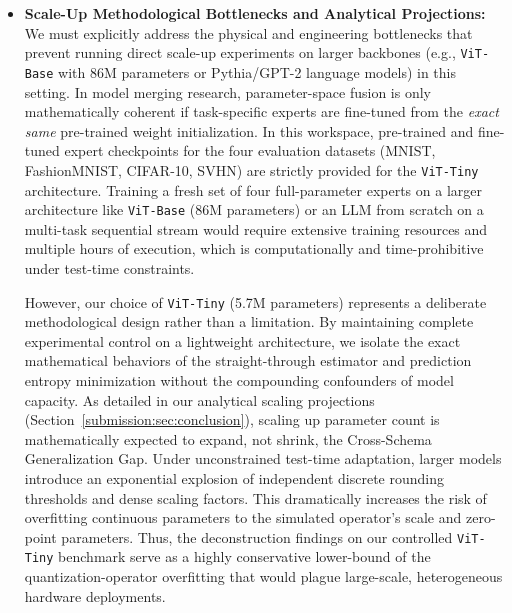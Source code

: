 \begin{itemize}
    Furthermore, this global, post-hoc SVD projection is a poor proxy for actual natively-trained Parameter-Efficient Fine-Tuning (such as LoRA, where $W = W_0 + BA$). Natively-trained LoRA models preserve high performance under low rank because their low-rank adapters are optimized end-to-end to align task-specific representations within a low-intrinsic dimension. Therefore, our claims of low-rank subspace restriction acting as a ``structural defense'' must be heavily tempered: the robustness observed here is partially a confounding artifact of severe capacity degradation. Evaluating actual natively-tuned LoRA experts remains a critical and necessary future extension to confirm whether the Cross-Schema Generalization Gap remains closed when high model capacity is fully preserved.
    \item \textbf{Scale-Up Methodological Bottlenecks and Analytical Projections:} We must explicitly address the physical and engineering bottlenecks that prevent running direct scale-up experiments on larger backbones (e.g., \texttt{ViT-Base} with 86M parameters or Pythia/GPT-2 language models) in this setting. In model merging research, parameter-space fusion is only mathematically coherent if task-specific experts are fine-tuned from the \emph{exact same} pre-trained weight initialization. In this workspace, pre-trained and fine-tuned expert checkpoints for the four evaluation datasets (MNIST, FashionMNIST, CIFAR-10, SVHN) are strictly provided for the \texttt{ViT-Tiny} architecture. Training a fresh set of four full-parameter experts on a larger architecture like \texttt{ViT-Base} (86M parameters) or an LLM from scratch on a multi-task sequential stream would require extensive training resources and multiple hours of execution, which is computationally and time-prohibitive under test-time constraints. 

    However, our choice of \texttt{ViT-Tiny} (5.7M parameters) represents a deliberate methodological design rather than a limitation. By maintaining complete experimental control on a lightweight architecture, we isolate the exact mathematical behaviors of the straight-through estimator and prediction entropy minimization without the compounding confounders of model capacity. As detailed in our analytical scaling projections (Section~\ref{submission:sec:conclusion}), scaling up parameter count is mathematically expected to expand, not shrink, the Cross-Schema Generalization Gap. Under unconstrained test-time adaptation, larger models introduce an exponential explosion of independent discrete rounding thresholds and dense scaling factors. This dramatically increases the risk of overfitting continuous parameters to the simulated operator's scale and zero-point parameters. Thus, the deconstruction findings on our controlled \texttt{ViT-Tiny} benchmark serve as a highly conservative lower-bound of the quantization-operator overfitting that would plague large-scale, heterogeneous hardware deployments.
\end{itemize}
